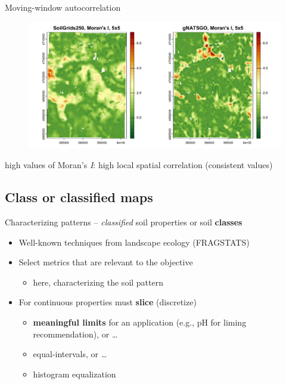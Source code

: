 \documentclass[aspectratio=169, 10pt]{beamer}
\begin{document}
\begin{frame}{Moving-window autocorrelation}
    \begin{figure}
        \centering
        \includegraphics[height=0.6\textheight]{./graphics_david/moving-window-5-1.png}
    \end{figure}
%
    high values of Moran's \textit{I}: high local spatial correlation (consistent values)
\end{frame}

\subsection{Class or classified maps}

\begin{frame}{Characterizing patterns -- \emph{classified} soil properties or soil \textbf{classes}}
\begin{itemize}
    \item Well-known techniques from landscape ecology (FRAGSTATS)
    \item Select metrics that are relevant to the objective
    \begin{itemize}
        \item here, characterizing the soil pattern
    \end{itemize}
    \item For continuous properties must \textbf{slice} (discretize)
    \begin{itemize}
        \item \textbf{meaningful limits} for an application (e.g., pH for liming recommendation), or \ldots
        \item equal-intervals, or \ldots
        \item histogram equalization
    \end{itemize}
\end{itemize}
\end{frame}
\end{document}
